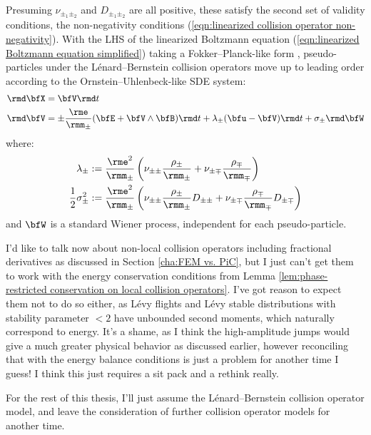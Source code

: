     Presuming $\nu_{\pm_{1}\pm_{2}}$ and $D_{\pm_{1}\pm_{2}}$ are all positive, these satisfy the second set of validity conditions, the non-negativity conditions (\ref{eqn:linearized collision operator non-negativity}). With the LHS of the linearized Boltzmann equation (\ref{eqn:linearized Boltzmann equation simplified}) taking a Fokker--Planck-like form \cite{Fokker_1914, Planck_1917}, pseudo-particles under the Lénard--Bernstein collision operators move up to leading order according to the Ornstein--Uhlenbeck-like \cite{Gardiner_1985, Karatzas_Shreve_1991, Gard_1998} SDE system:
    \begin{align}
        \rmd\bfX  &=  \bfV\rmd t  \label{eqn:particle motion SDE}  \\
        \rmd\bfV  &=  \pm\frac{\rme}{\rmm_{\pm}}(\bfE + \bfV\wedge\bfB)\rmd t + \lambda_{\pm}(\bfu - \bfV)\rmd t + \sigma_{\pm}\rmd\bfW  \label{eqn:particle forcing SDE}
    \end{align}
    where:
    \begin{align}
        \lambda_{\pm}                &:=  \frac{\rme^{2}}{\rmm_{\pm}}\left(\nu_{\pm\pm}\frac{\rho_{\pm}}{\rmm_{\pm}} + \nu_{\pm\mp}\frac{\rho_{\mp}}{\rmm_{\mp}}\right)  \\
        \frac{1}{2}\sigma_{\pm}^{2}  &:=  \frac{\rme^{2}}{\rmm_{\pm}}\left(\nu_{\pm\pm}\frac{\rho_{\pm}}{\rmm_{\pm}}D_{\pm\pm} + \nu_{\pm\mp}\frac{\rho_{\mp}}{\rmm_{\mp}}D_{\pm\mp}\right)
    \end{align}
    and $\bfW$ is a standard Wiener process, independent for each pseudo-particle.

    \begin{remark}
        I'd like to talk now about non-local collision operators including fractional derivatives as discussed in Section \ref{cha:FEM vs. PiC}, but I just can't get them to work with the energy conservation conditions from Lemma \ref{lem:phase-restricted conservation on local collision operators}. I've got reason to expect them not to do so either, as Lévy flights and Lévy stable distributions with stability parameter $< 2$ have unbounded second moments, which naturally correspond to energy. It's a shame, as I think the high-amplitude jumps would give a much greater physical behavior as discussed earlier, however reconciling that with the energy balance conditions is just a problem for another time I guess! I think this just requires a sit pack and a rethink really.

        For the rest of this thesis, I'll just assume the Lénard--Bernstein collision operator model, and leave the consideration of further collision operator models for another time.
    \end{remark}
    